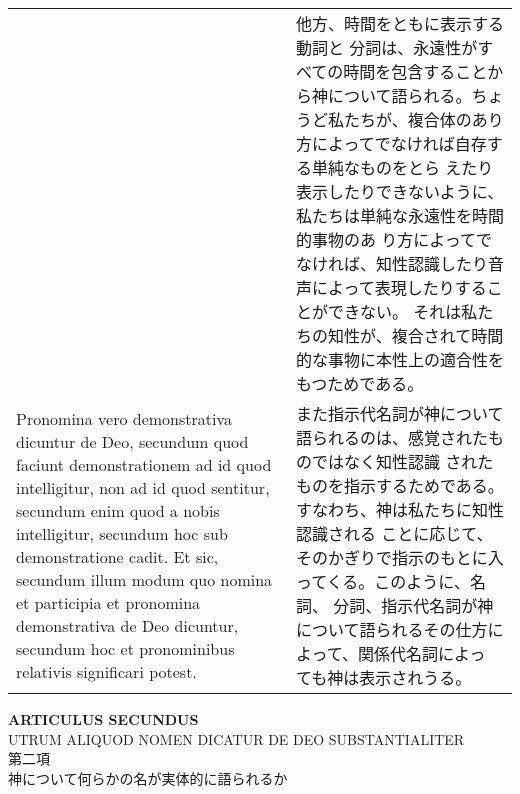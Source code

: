 \documentclass[10pt]{jsarticle} %
\begin{document}
\begin{longtable}{p{21em}p{21em}}
&

他方、時間をともに表示する動詞と
分詞は、永遠性がすべての時間を包含することから神について語られる。ちょ
うど私たちが、複合体のあり方によってでなければ自存する単純なものをとら
えたり表示したりできないように、私たちは単純な永遠性を時間的事物のあ
り方によってでなければ、知性認識したり音声によって表現したりすることができない。
それは私たちの知性が、複合されて時間的な事物に本性上の適合性をもつためである。

\\

Pronomina vero demonstrativa dicuntur de Deo, secundum quod
faciunt demonstrationem ad id quod intelligitur, non ad id quod
sentitur, secundum enim quod a nobis intelligitur, secundum hoc sub
demonstratione cadit. Et sic, secundum illum modum quo nomina et
participia et pronomina demonstrativa de Deo dicuntur, secundum hoc et
pronominibus relativis significari potest.

&

また指示代名詞が神について語られるのは、感覚されたものではなく知性認識
 されたものを指示するためである。すなわち、神は私たちに知性認識される
 ことに応じて、そのかぎりで指示のもとに入ってくる。このように、名詞、
 分詞、指示代名詞が神について語られるその仕方によって、関係代名詞によっ
 ても神は表示されうる。


\end{longtable}

\newpage
{}

\begin{center}
 {\Large {\bf ARTICULUS SECUNDUS}}\\
 {\large UTRUM ALIQUOD NOMEN DICATUR DE DEO SUBSTANTIALITER\\
第二項\\
神について何らかの名が実体的に語られるか}
\end{center}
\end{document}
